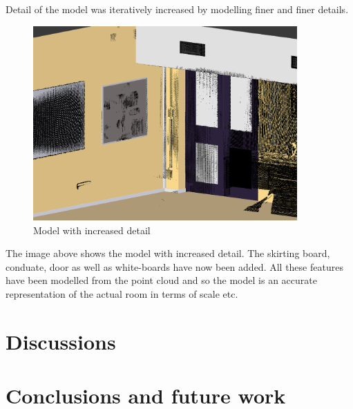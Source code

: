 \documentclass[11pt,a4paper]{report}
\begin{document}
				Detail of the model was iteratively increased by modelling finer and finer details.
				
				\begin{figure}[h!]
					\centering
					\includegraphics[width=0.9\textwidth]{model_with_increased_detail}
					\caption{Model with increased detail}
				\end{figure}
				
				The image above shows the model with increased detail. The skirting board, conduate, door as well as white-boards have now been added. All these features have been modelled from the point cloud and so the model is an accurate representation of the actual room in terms of scale etc.

\chapter{Discussions}

\chapter{Conclusions and future work}

\newpage
\printbibliography
\end{document}
